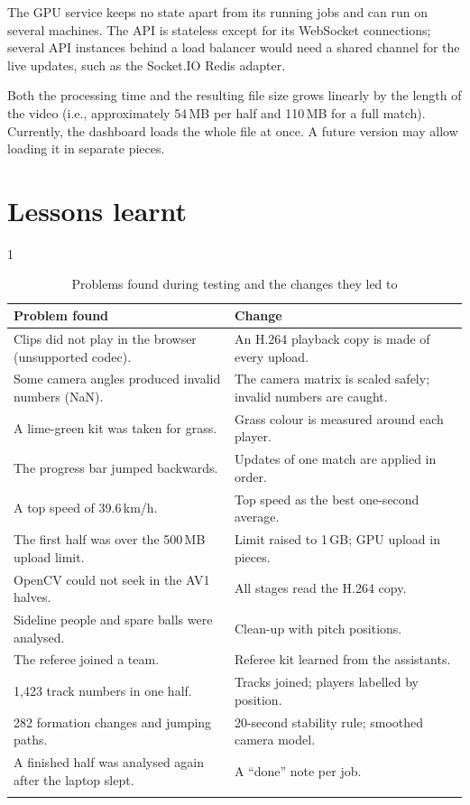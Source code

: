 The GPU service keeps no state apart from its running jobs and can run on several machines. The API is stateless except for its WebSocket connections; several API instances behind a load balancer would need a shared channel for the live updates, such as the Socket.IO Redis adapter.

Both the processing time and the resulting file size grows linearly by the length of the video (i.e., approximately 54\,MB per half and 110\,MB for a full match). Currently, the dashboard loads the whole file at once. A future version may allow loading it in separate pieces.

\section{Lessons learnt}

\begin{spacing}{1}
\begin{longtable}{|p{}|p{}|}
	\hline
	\textbf{Problem found} & \textbf{Change} \\
	\hline
	\endhead
	Clips did not play in the browser (unsupported codec). & An H.264 playback copy is made of every upload. \\
	\hline
	Some camera angles produced invalid numbers (NaN). & The camera matrix is scaled safely; invalid numbers are caught. \\
	\hline
	A lime-green kit was taken for grass. & Grass colour is measured around each player. \\
	\hline
	The progress bar jumped backwards. & Updates of one match are applied in order. \\
	\hline
	A top speed of 39.6\,km/h. & Top speed as the best one-second average. \\
	\hline
	The first half was over the 500\,MB upload limit. & Limit raised to 1\,GB; GPU upload in pieces. \\
	\hline
	OpenCV could not seek in the AV1 halves. & All stages read the H.264 copy. \\
	\hline
	Sideline people and spare balls were analysed. & Clean-up with pitch positions. \\
	\hline
	The referee joined a team. & Referee kit learned from the assistants. \\
	\hline
	1,423 track numbers in one half. & Tracks joined; players labelled by position. \\
	\hline
	282 formation changes and jumping paths. & 20-second stability rule; smoothed camera model. \\
	\hline
	A finished half was analysed again after the laptop slept. & A ``done'' note per job. \\
	\hline
	\caption{Problems found during testing and the changes they led to}
	\label{tab:lessons}
\end{longtable}
\end{spacing}

